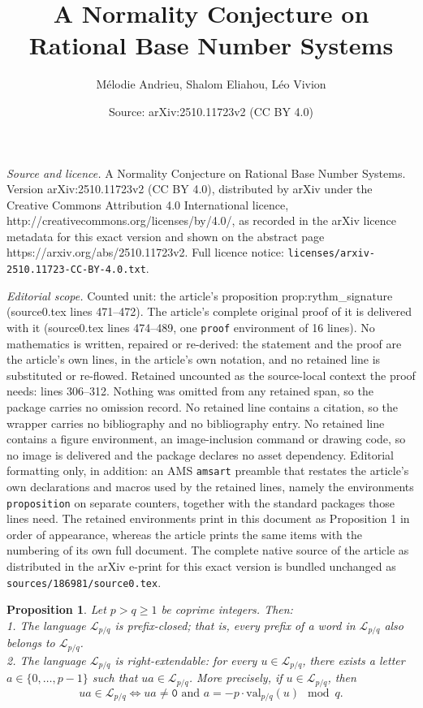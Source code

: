 \documentclass[10pt,a4paper]{amsart}
\title{A Normality Conjecture on Rational Base Number Systems}
\author{M\'elodie Andrieu, Shalom Eliahou, L\'eo Vivion}
\date{Source: arXiv:2510.11723v2 (CC BY 4.0)}
\newtheorem{proposition}{Proposition}
\newcommand{\lan}{\mathcal{L}}
\newcommand{\val}{\mathrm{val}}
\begin{document}
\maketitle

\noindent\emph{Source and licence.} A Normality Conjecture on Rational Base Number Systems. Version arXiv:2510.11723v2 (CC BY 4.0), distributed by arXiv under the Creative Commons Attribution 4.0 International licence, http://creativecommons.org/licenses/by/4.0/, as recorded in the arXiv licence metadata for this exact version and shown on the abstract page https://arxiv.org/abs/2510.11723v2. Full licence notice: \texttt{licenses/arxiv-2510.11723-CC-BY-4.0.txt}.\par\smallskip

\noindent\textit{Editorial scope.} Counted unit: the article's proposition prop:rythm\_signature (source0.tex lines 471--472). The article's complete original proof of it is delivered with it (source0.tex lines 474--489, one \texttt{proof} environment of 16 lines). No mathematics is written, repaired or re-derived: the statement and the proof are the article's own lines, in the article's own notation, and no retained line is substituted or re-flowed.  Retained uncounted as the source-local context the proof needs: lines 306--312.  Nothing was omitted from any retained span, so the package carries no omission record.  No retained line contains a citation, so the wrapper carries no bibliography and no bibliography entry.  No retained line contains a figure environment, an image-inclusion command or drawing code, so no image is delivered and the package declares no asset dependency.  Editorial formatting only, in addition: an AMS \texttt{amsart} preamble that restates the article's own declarations and macros used by the retained lines, namely the environments \texttt{proposition} on separate counters, together with the standard packages those lines need.  The retained environments print in this document as Proposition 1 in order of appearance, whereas the article prints the same items with the numbering of its own full document.  The complete native source of the article as distributed in the arXiv e-print for this exact version is bundled unchanged as \texttt{sources/186981/source0.tex}.
\begin{proposition}\label{prop:closeness_and_extendability} Let $p > q \geq 1$ be coprime integers. Then:\\
	1. The language $\lan_{p/q}$ is prefix-closed; that is, every prefix of a word in $\lan_{p/q}$ also belongs to $\lan_{p/q}$.\\
	2. The language $\lan_{p/q}$ is right-extendable: for every $u \in \lan_{p/q}$, there exists a letter $a \in \{0, \dots, p-1\}$ such that $ua \in \lan_{p/q}$. More precisely, if $u \in \lan_{p/q}$, then 
	\[
	ua \in \lan_{p/q} \iff ua \neq \mathtt{0} \text{ and } a = -p \cdot \val_{p/q}(u) \mod{q}.
	\] 
\end{proposition}
\end{document}
